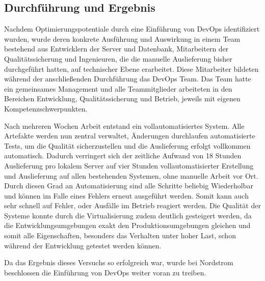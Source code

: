 \subsection{Durchführung und Ergebnis}
Nachdem Optimierungspotentiale durch eine Einführung von DevOps identifiziert wurden, wurde deren konkrete Ausführung und Auswirkung in einem Team bestehend aus Entwicklern der Server und Datenbank, Mitarbeitern der Qualitätssicherung und Ingenieuren, die die manuelle Auslieferung bisher durchgeführt hatten, auf technischer Ebene erarbeitet.
Diese Mitarbeiter bildeten während der anschließenden Durchführung das DevOps Team. 
Das Team hatte ein gemeinsames Management und alle Teammitglieder arbeiteten in den Bereichen Entwicklung, Qualitätssicherung und Betrieb, jeweils mit eigenen Kompetenzschwerpunkten. 
\parencite[Vgl.][S. 4]{Reed:2014}

Nach mehreren Wochen Arbeit entstand ein vollautomatisiertes System. 
Alle Artefakte werden nun zentral verwaltet, Änderungen durchlaufen automatisierte Tests, um die Qualität sicherzustellen und die Auslieferung erfolgt vollkommen automatisch. 
Dadurch verringert sich der zeitliche Aufwand von 18 Stunden Auslieferung pro lokalem Server auf vier Stunden vollautomatisierter Erstellung und Auslieferung auf allen bestehenden Systemen, ohne manuelle Arbeit vor Ort. 
Durch diesen Grad an Automatisierung sind alle Schritte beliebig Wiederholbar und können im Falle eines Fehlers erneut ausgeführt werden. 
Somit kann auch sehr schnell auf Fehler, oder Ausfälle im Betrieb reagiert werden. 
Die Qualität der Systeme konnte durch die Virtualisierung zudem deutlich gesteigert werden, da die Entwicklungsumgebungen exakt den Produktionsumgebungen gleichen und somit alle Eigenschaften, besonders das Verhalten unter hoher Last, schon während der Entwicklung getestet werden können. 
\parencite[Vgl.][S. 6]{Reed:2014}

Da das Ergebnis dieses Versuchs so erfolgreich war, wurde bei Nordstrom beschlossen die Einführung von DevOps weiter voran zu treiben. \parencite[Vgl.][S. 14]{Reed:2014}
